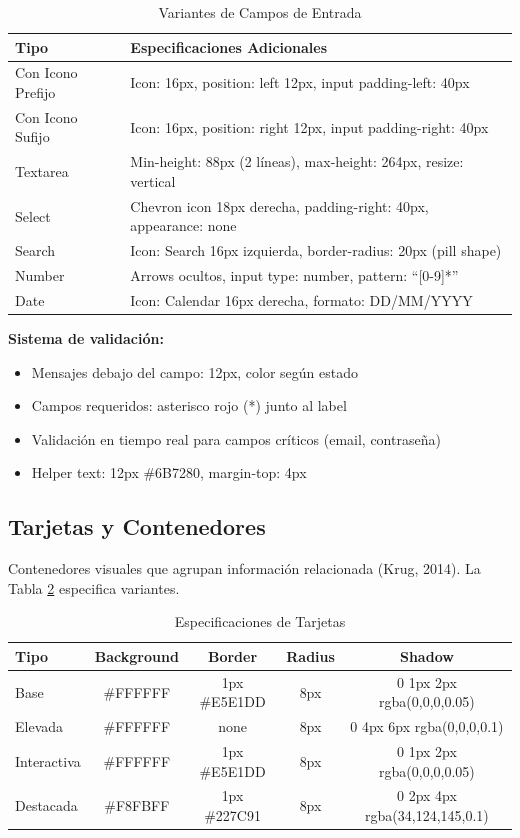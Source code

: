 \documentclass[12pt,a4paper,oneside]{article}
\begin{document}
\begin{table}[h]
\centering
\caption{Variantes de Campos de Entrada}
\label{tab:inputs-variantes}
\small
\begin{tabular}{|l|p{9cm}|}
\hline
\textbf{Tipo} & \textbf{Especificaciones Adicionales} \\
\hline
Con Icono Prefijo & Icon: 16px, position: left 12px, input padding-left: 40px \\
\hline
Con Icono Sufijo & Icon: 16px, position: right 12px, input padding-right: 40px \\
\hline
Textarea & Min-height: 88px (2 líneas), max-height: 264px, resize: vertical \\
\hline
Select & Chevron icon 18px derecha, padding-right: 40px, appearance: none \\
\hline
Search & Icon: Search 16px izquierda, border-radius: 20px (pill shape) \\
\hline
Number & Arrows ocultos, input type: number, pattern: ``[0-9]*'' \\
\hline
Date & Icon: Calendar 16px derecha, formato: DD/MM/YYYY \\
\hline
\end{tabular}
\end{table}

\textbf{Sistema de validación:}
\begin{itemize}
    \item Mensajes debajo del campo: 12px, color según estado
    \item Campos requeridos: asterisco rojo (*) junto al label
    \item Validación en tiempo real para campos críticos (email, contraseña)
    \item Helper text: 12px \#6B7280, margin-top: 4px
\end{itemize}

\subsection{Tarjetas y Contenedores}

Contenedores visuales que agrupan información relacionada (Krug, 2014). La Tabla \ref{tab:cards-specs} especifica variantes.

\begin{table}[h]
\centering
\caption{Especificaciones de Tarjetas}
\label{tab:cards-specs}
\small
\begin{tabular}{|l|c|c|c|c|}
\hline
\textbf{Tipo} & \textbf{Background} & \textbf{Border} & \textbf{Radius} & \textbf{Shadow} \\
\hline
Base & \#FFFFFF & 1px \#E5E1DD & 8px & 0 1px 2px rgba(0,0,0,0.05) \\
\hline
Elevada & \#FFFFFF & none & 8px & 0 4px 6px rgba(0,0,0,0.1) \\
\hline
Interactiva & \#FFFFFF & 1px \#E5E1DD & 8px & 0 1px 2px rgba(0,0,0,0.05) \\
\hline
Destacada & \#F8FBFF & 1px \#227C91 & 8px & 0 2px 4px rgba(34,124,145,0.1) \\
\hline
\end{tabular}
\end{table}
\end{document}
